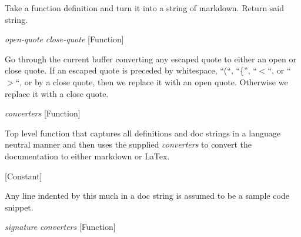 \begin{doc-string}
Take a function definition and turn it into a string of markdown.  Return said string.
\end{doc-string}

\vspace{1em}
\noindent
{}
\usebox{\funcname}\emph{open-quote} \emph{close-quote}
 \hfill [Function]

\begin{doc-string}
Go through the current buffer converting any escaped quote to either an open or
close quote.  If an escaped quote is preceded by whitespace, ``(``, ``\{'', ``$<$``, or ``$>$``,
or by a close quote, then we replace it with an open quote.  Otherwise we replace it
with a close quote.
\end{doc-string}

\vspace{1em}
\noindent
{}
\usebox{\funcname}\emph{converters}
 \hfill [Function]

\begin{doc-string}
Top level function that captures all definitions and doc strings in a language
neutral manner and then uses the supplied \emph{converters} to convert the documentation to
either markdown or LaTex.
\end{doc-string}

\vspace{1em}
\noindent
{}
\usebox{\funcname}
 \hfill [Constant]

\begin{doc-string}
Any line indented by this much in a doc string is assumed to be a sample
code snippet.
\end{doc-string}

\vspace{1em}
\noindent
{}
\usebox{\funcname}\emph{signature} \emph{converters}
 \hfill [Function]

